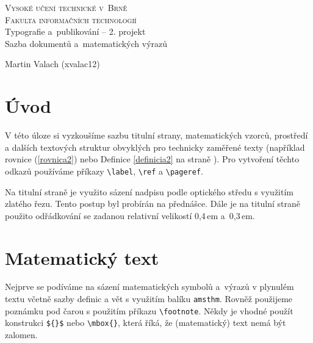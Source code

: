 \documentclass[a4paper, 11pt, twocolumn]{article}
\author{Martin Valach//xvalac12@stud.fit.vutbr.cz}
\theoremstyle{definition}
\theoremstyle{plain}
\begin{document}
    \begin{titlepage}
		\begin{center}
			{\Huge\textsc{
			    Vysoké učení technické v~Brně
			    \\[0.2em]
			}
			\huge\textsc{
			    Fakulta informačních technologií
			}
			}
			{\LARGE
				\\ Typografie a~publikování -- 2. projekt \\[0.3em]
				Sazba dokumentů a~matematických výrazů
			}
		\end{center}

		{\Large
			\the\year
			\hfill Martin Valach (xvalac12)
		}
	\end{titlepage}

    \section*{Úvod}
        V této úloze si vyzkoušíme sazbu titulní strany, matematic\-kých vzorců, prostředí a dalších textových struktur obvyk\-lých pro technicky zaměřené texty (například rovnice (\ref{rovnica2}) nebo Definice \ref{definicia2} na straně \pageref{definicia2}). Pro vytvoření těchto odkazů používáme příkazy \verb|\label|, \verb|\ref| a \verb|\pageref|.

        Na titulní straně je využito sázení nadpisu podle op\-tického středu s využitím zlatého řezu. Tento postup byl probírán na přednášce. Dále je na titulní straně použito odřádkování se zadanou relativní velikostí 0,4\,em a~0,3\,em.


    \section{Matematický text}

        Nejprve se podíváme na sázení matematických symbolů a~výrazů v plynulém textu včetně sazby definic a vět s vy\-užitím balíku \texttt{amsthm}. Rovněž použijeme poznámku pod čarou s použitím příkazu \verb|\footnote|. Někdy je vhodné použít konstrukci \verb|${}$| nebo \verb|\mbox{}|, která říká, že (matematický) text nemá být zalomen. 
\end{document}
